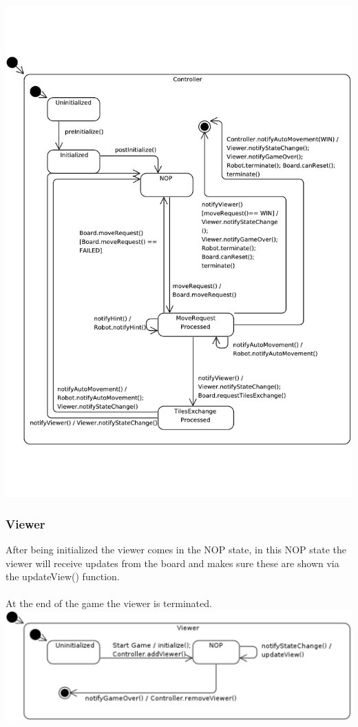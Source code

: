 	\includegraphics[width=\linewidth]{statecharts/controller.pdf}

	\subsubsection{Viewer}
	After being initialized the viewer comes in the NOP state, in this NOP state the viewer will receive updates from the board and makes sure these are shown via the updateView() function.\\
\\
At the end of the game the viewer is terminated.\\
	
	\includegraphics[width=\linewidth]{statecharts/viewer.pdf}

